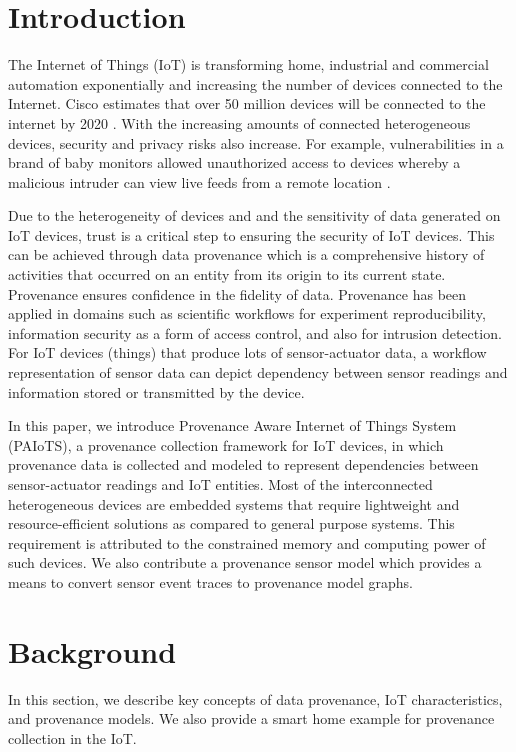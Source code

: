 \documentclass[conference]{IEEEtran}
\begin{document}
\section{Introduction}
The Internet of Things (IoT) is transforming home, industrial and commercial automation exponentially and increasing the number of devices connected to the Internet. Cisco estimates that over 50 million devices will be connected to the internet by 2020 \cite{dave}. With the increasing amounts of connected heterogeneous devices, security and privacy risks also increase. For example, vulnerabilities in a brand of baby monitors allowed unauthorized access to devices whereby a malicious intruder can view live feeds from a remote location \cite{rapid7}. 

\par Due to the heterogeneity of devices and and the sensitivity of data generated on IoT devices, trust is a critical step to ensuring the security of IoT devices. This can be achieved through data provenance which is a comprehensive history of activities that occurred on an entity from its origin to its current state. Provenance ensures confidence in the fidelity of data. Provenance has been applied in domains such as scientific workflows for experiment reproducibility, information security as a form of access control, and also for intrusion detection. For IoT devices (things) that produce lots of sensor-actuator data, a workflow representation of sensor data can depict dependency between sensor readings and information stored or transmitted by the device. 

\par In this paper, we introduce Provenance Aware Internet of Things System (PAIoTS), a provenance collection framework for IoT devices, in which provenance data is collected and modeled to represent dependencies between sensor-actuator readings and IoT entities. Most of the interconnected heterogeneous devices are embedded systems that require lightweight and resource-efficient solutions as compared to general purpose
systems. This requirement is attributed to the constrained memory and computing power of such devices. We also contribute a provenance sensor model which provides a means to convert sensor event traces to provenance model graphs.



\section{Background} 
In this section, we  describe key concepts of data provenance, IoT characteristics, and provenance models. We also provide a smart home example for provenance collection in the IoT.
\end{document}

